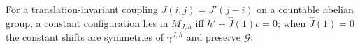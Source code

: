 \begin{proposition}
    \label{prop:gs-13-3}
    \leanok

    For a translation-invariant coupling $J(i,j) = J'(j-i)$ on a countable abelian group, a
    constant configuration lies in $M_{J,h}$ iff $h' + \hat J(1)c = 0$; when $\hat J(1) = 0$ the
    constant shifts are symmetries of $\gamma^{J,h}$ and preserve $\mathcal G$.
\end{proposition}
